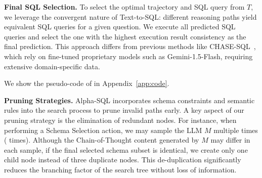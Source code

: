 \textbf{Final SQL Selection.} 
To select the optimal trajectory and SQL query from $T$, we leverage the convergent nature of Text-to-SQL: different reasoning paths yield equivalent SQL queries for a given question. We execute all predicted SQL queries and select the one with the highest execution result consistency as the final prediction. This approach differs from previous methods like CHASE-SQL~\cite{CHASE}, which rely on fine-tuned proprietary models such as Gemini-1.5-Flash, requiring extensive domain-specific data.

We show the pseudo-code of \sys in Appendix~\ref{app:code}.

\textbf{Pruning Strategies.}  
Alpha-SQL incorporates schema constraints and semantic rules into the search process to prune invalid paths early. A key aspect of our pruning strategy is the elimination of redundant nodes. For instance, when performing a Schema Selection action, we may sample the LLM $M$ multiple times ( times). Although the Chain-of-Thought content generated by $M$ may differ in each sample, if the final selected schema subset is identical, we create only one child node instead of three duplicate nodes. This de-duplication significantly reduces the branching factor of the search tree without loss of information.




